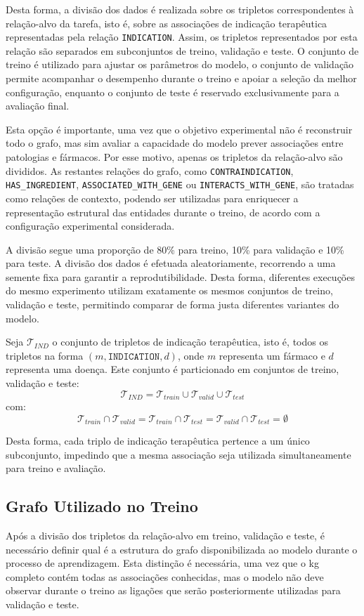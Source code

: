 Desta forma, a divisão dos dados é realizada sobre os tripletos correspondentes à relação-alvo da tarefa, isto é, sobre as associações de indicação terapêutica representadas pela relação \texttt{INDICATION}. Assim, os tripletos representados por esta relação são separados em subconjuntos de treino, validação e teste. O conjunto de treino é utilizado para ajustar os parâmetros do modelo, o conjunto de validação permite acompanhar o desempenho durante o treino e apoiar a seleção da melhor configuração, enquanto o conjunto de teste é reservado exclusivamente para a avaliação final.

Esta opção é importante, uma vez que o objetivo experimental não é reconstruir todo o grafo, mas sim avaliar a capacidade do modelo prever associações entre patologias e fármacos. Por esse motivo, apenas os tripletos da relação-alvo são divididos. As restantes relações do grafo, como \texttt{CONTRAINDICATION}, \texttt{HAS\_INGREDIENT}, \texttt{ASSOCIATED\_WITH\_GENE} ou \texttt{INTERACTS\_WITH\_GENE}, são tratadas como relações de contexto, podendo ser utilizadas para enriquecer a representação estrutural das entidades durante o treino, de acordo com a configuração experimental considerada.

A divisão segue uma proporção de 80\% para treino, 10\% para validação e 10\% para teste. A divisão dos dados é efetuada aleatoriamente, recorrendo a uma semente fixa para garantir a reprodutibilidade. Desta forma, diferentes execuções do mesmo experimento utilizam exatamente os mesmos conjuntos de treino, validação e teste, permitindo comparar de forma justa diferentes variantes do modelo.

Seja \(\mathcal{T}_{IND}\) o conjunto de tripletos de indicação terapêutica, isto é, todos os tripletos na forma \((m, \texttt{INDICATION}, d)\), onde \(m\) representa um fármaco e \(d\) representa uma doença. Este conjunto é particionado em conjuntos de treino, validação e teste:
\[\mathcal{T}_{IND}=\mathcal{T}_{train}\cup\mathcal{T}_{valid}\cup\mathcal{T}_{test}\]
com:\[\mathcal{T}_{train}\cap\mathcal{T}_{valid}=\mathcal{T}_{train}\cap\mathcal{T}_{test}=\mathcal{T}_{valid}\cap\mathcal{T}_{test}=\emptyset\]

Desta forma, cada triplo de indicação terapêutica pertence a um único subconjunto, impedindo que a mesma associação seja utilizada simultaneamente para treino e avaliação.

\subsection{Grafo Utilizado no Treino}
\label{subsec:grafo-treino}
Após a divisão dos tripletos da relação-alvo em treino, validação e teste, é necessário definir qual é a estrutura do grafo disponibilizada ao modelo durante o processo de aprendizagem. Esta distinção é necessária, uma vez que o \acrshort{kg} completo contém todas as associações conhecidas, mas o modelo não deve observar durante o treino as ligações que serão posteriormente utilizadas para validação e teste.

